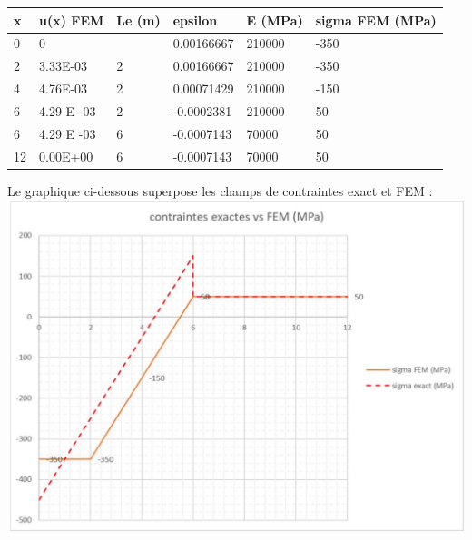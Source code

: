 \documentclass[11pt,a4paper]{report}
\begin{document}
{\begin{center}
\begin{tabular}{|l|l|l|l|l|l|}
\hline
x & u(x) FEM & Le (m) & epsilon & E (MPa) & sigma FEM (MPa) \\
\hline
0 & 0 &  & 0.00166667 & 210000 & -350 \\
\hline
2 & 3.33E-03 & 2 & 0.00166667 & 210000 & -350 \\
\hline
4 & 4.76E-03 & 2 & 0.00071429 & 210000 & -150 \\
\hline
6 & 4.29 E -03 & 2 & -0.0002381 & 210000 & 50 \\
\hline
6 & 4.29 E -03 & 6 & -0.0007143 & 70000 & 50 \\
\hline
12 & 0.00E+00 & 6 & -0.0007143 & 70000 & 50 \\
\hline
\end{tabular}
\end{center}

Le graphique ci-dessous superpose les champs de contraintes exact et FEM :\\
\includegraphics[max width=\textwidth, center]{2025_10_03_26e11264345fd9bad5cag-9}

}
\end{document}
